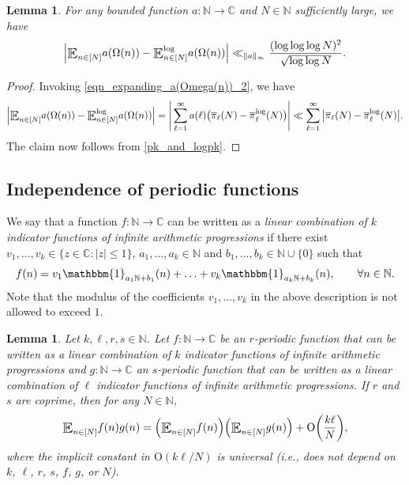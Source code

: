 \documentclass[letter,11pt]{article}
\theoremstyle{plain} %
\newtheorem{lemma}[theorem]{Lemma}
\theoremstyle{definition} %
\theoremstyle{plain}
\theoremstyle{plain}
\theoremstyle{plain}
\numberwithin{equation}{section}
\newcommand{\Oh}{{\mathrm O}}
\newcommand{\N}{\mathbb{N}}
\newcommand{\C}{\mathbb{C}}
\renewcommand{\leq}{\leqslant}
\newcommand{\E}{\raisebox{-0.4ex}{\scalebox{1.4}[1.3]{$\mathbb{E}$}}}
\newcommand{\Esub}[1]{\raisebox{-0.4ex}{\scalebox{1.4}[1.3]{$\mathbb{E}$}}\raisebox{-0.35ex}{\ensuremath{_{\scriptstyle #1}}}}
\newcommand{\logE}{{\E}^{\log}}
\newcommand{\1}{\mathbbm{1}}
\begin{document}
\begin{lemma}\label{aOmega_and_logaOmega}
For any bounded function $a\colon \N\to\C$ and $N\in\N$ sufficiently large, we have  
$$
\Big|\Esub{n\in[N]} a(\Omega(n))-\logE_{n\in[N]} a(\Omega(n))\Big| 
\ll_{\|a\|_\infty} \frac{(\log\log\log{N})^2}{\sqrt{\log\log{N}}}.
$$
\end{lemma}

\begin{proof}
Invoking \eqref{eqn_expanding_a(Omega(n))_2}, we have
$$
\Big|\Esub{n\in[N]} a(\Omega(n))-\logE_{n\in[N]} a(\Omega(n))\Big|
=
\Bigg|\sum_{\ell=1}^\infty a(\ell)\big(
\overline{\pi}_\ell(N) -\overline{\pi}^{\log}_\ell(N)\big)
\Bigg|
\ll
\sum_{\ell=1}^\infty \big|
\overline{\pi}_\ell(N) -\overline{\pi}^{\log}_\ell(N)\big|.
$$
The claim now follows from \cref{pk_and_logpk}.
\end{proof}


\subsection{Independence of periodic functions}

We say that a function $f\colon\N\to\C$ can be written as a \emph{linear combination of $k$ indicator functions of infinite arithmetic progressions} if there exist $v_1,\ldots,v_k\in\{z\in\C: |z|\leq 1\}$, $a_1,\ldots,a_k\in\N$ and $b_1,\ldots,b_k\in\N\cup\{0\}$ such that
$$
f(n)=
v_1 \1_{a_1\N+b_1}(n)+\ldots+v_k \1_{a_k\N+b_k}(n),
\qquad\forall n\in\N.
$$
Note that the modulus of the coefficients $v_1,\ldots,v_k$ in the above description is not allowed to exceed $1$.


\begin{lemma}
\label{lem_independence_periodic_fctns_np_1}
Let $k,\ell,r,s\in\N$. Let $f\colon\N\to\C$ be an $r$-periodic function that can be written as a linear combination of $k$ indicator functions of infinite arithmetic progressions and $g\colon \N\to\C$ an $s$-periodic function that can be written as a linear combination of $\ell$ indicator functions of infinite arithmetic progressions. If $r$ and $s$ are coprime, then for any $N\in\N$,
\begin{equation}
\label{eqn_periodic_fctn_independence_np_1}
\Esub{n\in[N]} f(n)g(n) = \Big(\Esub{n\in[N]} f(n)\Big)\Big(\Esub{n\in[N]} g(n)\Big) + \Oh\bigg(\frac{k\ell}{N}\bigg),
\end{equation}
where the implicit constant in $\Oh(k\ell/N)$ is universal (i.e., does not depend on $k$, $\ell$, $r$, $s$, $f$, $g$, or $N$).
\end{lemma}
\end{document}
